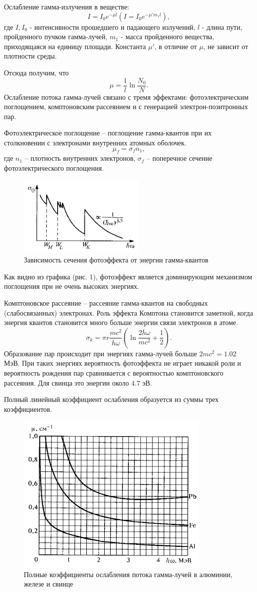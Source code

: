 \documentclass[a4paper,12pt]{article}
\theoremstyle{plain} %
\theoremstyle{definition} %
\theoremstyle{remark} %
\begin{document}
Ослабление гамма-излучения в веществе:
\[I = I_0e^{-\mu l} (I = I_0e^{-\mu'm_1 l}),\]
где $I, I_0$ - интенсивности прошедшего и падающего излучений, $l$ - длина пути, пройденного пучком гамма-лучей, $m_1$ - масса пройденного вещества, приходящаяся на единицу площади. Константа $\mu'$, в отличие от $\mu$, не зависит от плотности среды.\par
Отсюда получим, что 
\[\mu = \frac{1}{l} \ln{\frac{N_0}{N}}.\]
Ослабление потока гамма-лучей связано с тремя эффектами: фотоэлектрическим поглощением, комптоновским рассеянием и с генерацией электрон-позитронных пар.\par
Фотоэлектрическое поглощение -- поглощение гамма-квантов при их столкновении с электронами внутренних атомных оболочек.
\[\mu_f = \sigma_f n_1,\]
где $n_1$ -- плотность внутренних электронов, $\sigma_f$ -- поперечное сечение фотоэлектрического поглощения.
\begin{figure}[h]
    \centering
    \includegraphics{img1.png}
    \caption{Зависимость сечения фотоэффекта от энергии гамма-квантов}
    \label{fig:my_label}
\end{figure}
Как видно из графика (рис. 1), фотоэффект является доминирующим механизмом поглощения при не очень высоких энергиях.\par
Комптоновское рассеяние -- рассеяние гамма-квантов на свободных (слабосвязанных) электронах. Роль эффекта Комптона становится заметной, когда энергия квантов становится много больше энергии связи электронов в атоме.
\[\sigma_k = \pi r \frac{mc^2}{\overline{h}\omega}\left(\ln{\frac{2\overline{h}\omega}{mc^2}} + \frac{1}{2}\right).\]
Образование пар происходит при энергиях гамма-лучей больше $2mc^2 = 1.02$ МэВ. При таких энергиях вероятность фотоэффекта не играет никакой роли и вероятность рождения пар сравнивается с вероятностью комптоновского рассеяния. Для свинца это энергии около $4.7$ эВ.\par
\newpage
Полный линейный коэффициент ослабления образуется из суммы трех коэффициентов.
\begin{figure}[h]
    \centering
    \includegraphics[width=0.5 \textwidth]{img2.png}
    \caption{Полные коэффициенты ослабления потока гамма-лучей в алюминии, железе и свинце}
    \label{fig:my_label}
\end{figure}
\end{document}
